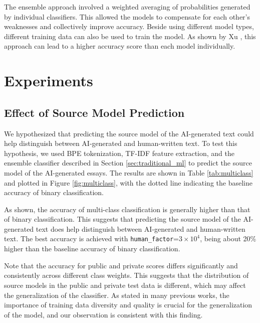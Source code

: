 \documentclass[conference]{IEEEtran}
\begin{document}
The ensemble approach involved a weighted averaging of probabilities generated by individual classifiers. This allowed the models to compensate for each other's weaknesses and collectively improve accuracy. Beside using different model types, different training data can also be used to train the model. As shown by Xu \cite{2ndplace}, this approach can lead to a higher accuracy score than each model individually.

\section{Experiments}

\subsection{Effect of Source Model Prediction}

We hypothesized that predicting the source model of the AI-generated text could help distinguish between AI-generated and human-written text. To test this hypothesis, we used BPE tokenization, TF-IDF feature extraction, and the ensemble classifier described in Section \ref{sec:traditional_ml} to predict the source model of the AI-generated essays. The results are shown in Table \ref{tab:multiclass} and plotted in Figure \ref{fig:multiclass}, with the dotted line indicating the baseline accuracy of binary classification.

As shown, the accuracy of multi-class classification is generally higher than that of binary classification. This suggests that predicting the source model of the AI-generated text does help distinguish between AI-generated and human-written text. The best accuracy is achieved with \texttt{human\_factor}=$3 \times 10^4$, being about 20\% higher than the baseline accuracy of binary classification.

Note that the accuracy for public and private scores differs significantly and consistently across different class weights. This suggests that the distribution of source models in the public and private test data is different, which may affect the generalization of the classifier. As stated in many previous works, the importance of training data diversity and quality is crucial for the generalization of the model, and our observation is consistent with this finding.
\end{document}
